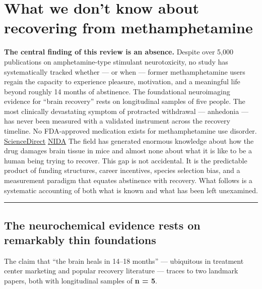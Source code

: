 ﻿\section{What we don't know about recovering from methamphetamine}\label{14_what_we_dont_know-what-we-dont-know-about-recovering-from-methamphetamine}

\textbf{The central finding of this review is an absence.} Despite over 5,000 publications on amphetamine-type stimulant neurotoxicity, no study has systematically tracked whether --- or when --- former methamphetamine users regain the capacity to experience pleasure, motivation, and a meaningful life beyond roughly 14 months of abstinence. The foundational neuroimaging evidence for ``brain recovery'' rests on longitudinal samples of five people. The most clinically devastating symptom of protracted withdrawal --- anhedonia --- has never been measured with a validated instrument across the recovery timeline. No FDA-approved medication exists for methamphetamine use disorder. \href{https://www.sciencedirect.com/science/article/abs/pii/S009174352300230X}{ScienceDirect} \href{https://nida.nih.gov/publications/drugs-brains-behavior-science-addiction/treatment-recovery}{NIDA} The field has generated enormous knowledge about how the drug damages brain tissue in mice and almost none about what it is like to be a human being trying to recover. This gap is not accidental. It is the predictable product of funding structures, career incentives, species selection bias, and a measurement paradigm that equates abstinence with recovery. What follows is a systematic accounting of both what is known and what has been left unexamined.

\begin{center}\rule{0.5\linewidth}{0.5pt}\end{center}

\subsection{The neurochemical evidence rests on remarkably thin foundations}\label{14_what_we_dont_know-the-neurochemical-evidence-rests-on-remarkably-thin-foundations}

The claim that ``the brain heals in 14--18 months'' --- ubiquitous in treatment center marketing and popular recovery literature --- traces to two landmark papers, both with longitudinal samples of \textbf{n = 5}.

